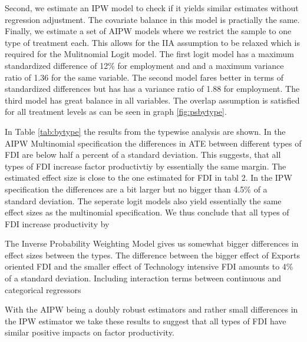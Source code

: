 \documentclass[a4paper,11pt]{scrartcl}
\begin{document}
Second, we estimate an IPW model to check if it yields similar estimates without regression adjustment. The covariate balance in this model is practially the same. Finally, we estimate a set of AIPW models where we restrict the sample to one type of treatment each. This allows for the IIA assumption to be relaxed which is required for the Mulitnomial Logit model. The first logit model has a maximum standardized difference of 12\% for employment and and a maximum variance ratio of 1.36 for the same variable. The second model fares better in terms of standardized differences but has has a variance ratio of 1.88 for employment. The third model has great balance in all variables. The overlap assumption is satisfied for all treatment levels as can be seen in graph \ref{fig:psbytype}. 


In Table \ref{tab:bytype} the results from the typewise analysis are shown. In the AIPW Multinomial specification the differences in ATE between different types of FDI are below half a percent of a standard deviation. This suggests, that all types of FDI increase factor productivtiy by essentially the same margin. The estimated effect size is close to the one estimated for FDI in tabl 2. In the IPW specification the differences are a bit larger but no bigger than 4.5\% of a standard deviation. The seperate logit models also yield essentially the same effect sizes as the multinomial specification. We thus conclude that all types of FDI increase productivity by 

The Inverse Probability Weighting Model gives us somewhat bigger differences in effect sizes between the types. The difference between the bigger effect of Exports oriented FDI and the smaller effect of Technology intensive FDI amounts to 4\% of a standard deviation. Including interaction terms between continuous and categorical regressors 

With the AIPW being a doubly robust estimators and rather small differences in the IPW estimator we take these results to suggest that all types of FDI have similar positive impacts on factor productivity. 
\end{document}
